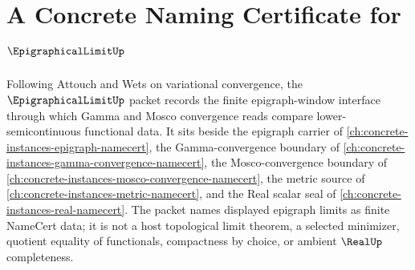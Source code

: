 \chapter{A Concrete Naming Certificate for $\EpigraphicalLimitUp$}
\label{ch:concrete-instances-epigraphical-limit-namecert}

Following Attouch and Wets on variational convergence, the $\EpigraphicalLimitUp$ packet records the finite epigraph-window interface through which Gamma and Mosco convergence reads compare lower-semicontinuous functional data. It sits beside the epigraph carrier of \autoref{ch:concrete-instances-epigraph-namecert}, the Gamma-convergence boundary of \autoref{ch:concrete-instances-gamma-convergence-namecert}, the Mosco-convergence boundary of \autoref{ch:concrete-instances-mosco-convergence-namecert}, the metric source of \autoref{ch:concrete-instances-metric-namecert}, and the Real scalar seal of \autoref{ch:concrete-instances-real-namecert}. The packet names displayed epigraph limits as finite NameCert data; it is not a host topological limit theorem, a selected minimizer, quotient equality of functionals, compactness by choice, or ambient $\RealUp$ completeness.

